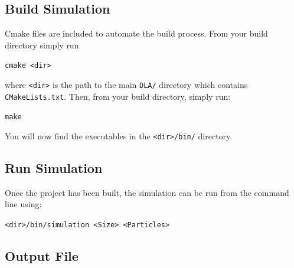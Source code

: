 \documentclass[fleqn,10pt]{SelfArx} %
\begin{document}
\subsection{Build Simulation}
Cmake files are included to automate the build process. From your build directory simply run
\begin{center}
    \texttt{cmake <dir>}
\end{center}
where \texttt{<dir>} is the path to the main \texttt{DLA/} directory which contains \texttt{CMakeLists.txt}. 
Then, from your build directory, simply run:
\begin{center}
    \texttt{make}
\end{center}
You will now find the executables in the \texttt{<dir>/bin/} directory.
\subsection{Run Simulation}
Once the project has been built, the simulation can be run from the command line using:
\begin{center}
    \texttt{<dir>/bin/simulation <Size> <Particles>}
\end{center}
\subsection{Output File}
\end{document}
